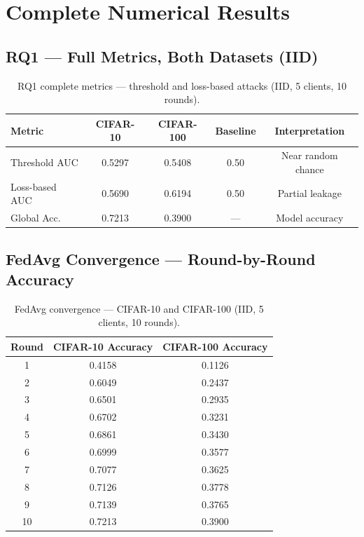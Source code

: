 \documentclass[12pt, a4paper]{report}
\begin{document}
\chapter{Complete Numerical Results}
\label{app:results}

\section{RQ1 --- Full Metrics, Both Datasets (IID)}
\begin{table}[H]
  \centering
  \caption{RQ1 complete metrics --- threshold and loss-based attacks (IID, 5 clients, 10 rounds).}
  \begin{tabular}{lcccc}
    \toprule
    \textbf{Metric} & \textbf{CIFAR-10} & \textbf{CIFAR-100} & \textbf{Baseline} & \textbf{Interpretation} \\
    \midrule
    Threshold AUC   & 0.5297 & 0.5408 & 0.50 & Near random chance \\
    Loss-based AUC  & 0.5690 & 0.6194 & 0.50 & Partial leakage \\
    Global Acc.     & 0.7213 & 0.3900 & ---  & Model accuracy \\
    \bottomrule
  \end{tabular}
\end{table}

\section{FedAvg Convergence --- Round-by-Round Accuracy}
\begin{table}[H]
  \centering
  \caption{FedAvg convergence --- CIFAR-10 and CIFAR-100 (IID, 5 clients, 10 rounds).}
  \begin{tabular}{ccc}
    \toprule
    \textbf{Round} & \textbf{CIFAR-10 Accuracy} & \textbf{CIFAR-100 Accuracy} \\
    \midrule
    1  & 0.4158 & 0.1126 \\
    2  & 0.6049 & 0.2437 \\
    3  & 0.6501 & 0.2935 \\
    4  & 0.6702 & 0.3231 \\
    5  & 0.6861 & 0.3430 \\
    6  & 0.6999 & 0.3577 \\
    7  & 0.7077 & 0.3625 \\
    8  & 0.7126 & 0.3778 \\
    9  & 0.7139 & 0.3765 \\
    10 & 0.7213 & 0.3900 \\
    \bottomrule
  \end{tabular}
\end{table}
\end{document}
